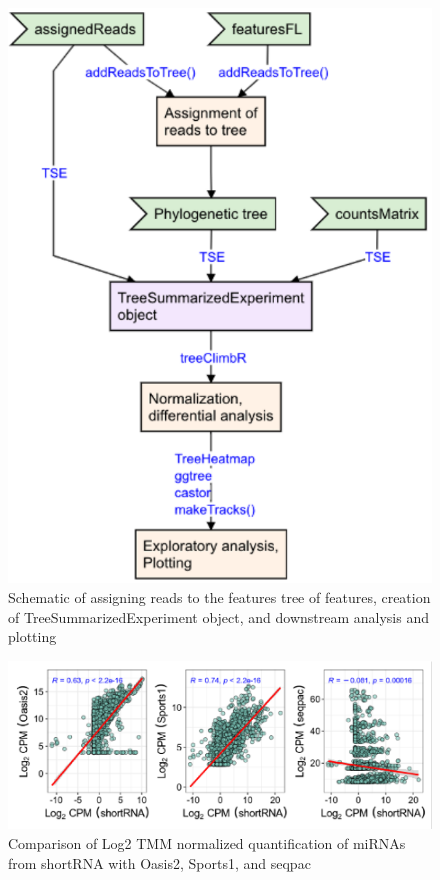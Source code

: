 \documentclass[12pt,twoside]{reedthesis}
\begin{document}
\begin{figure}[H]

{\centering \includegraphics{thesis_files/figure-latex/3f12-1} 

}

\caption{Schematic of assigning reads to the features tree of features, creation of TreeSummarizedExperiment object, and downstream analysis and plotting}\label{fig:3f12}
\end{figure}

\begin{figure}[H]

{\centering \includegraphics{thesis_files/figure-latex/3f13-1} 

}

\caption{Comparison of Log2 TMM normalized quantification of miRNAs from shortRNA with Oasis2, Sports1, and seqpac}\label{fig:3f13}
\end{figure}
\end{document}
